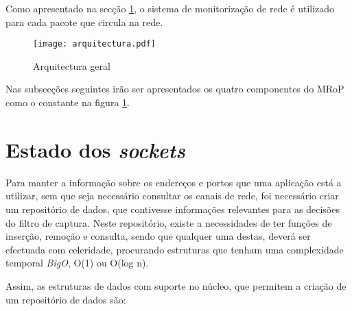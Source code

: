 Como apresentado na secção \ref{}, o sistema de monitorização de rede é utilizado para cada pacote que circula na rede.

\begin{figure}[ht]
\centering
\texttt{[image: arquitectura.pdf]}
\caption{Arquitectura geral}
\label{fig:general_architecture}
\end{figure}







Nas subsecções seguintes irão ser apresentados os quatro componentes do MRoP como o constante na figura \ref{fig:general_architecture}.


\section{Estado dos \textit{sockets}}

Para manter a informação sobre os endereços e portos que uma aplicação está a utilizar, sem que seja necessário consultar os canais de rede, foi necessário criar um repositório de dados, que contivesse informações relevantes para as decisões do filtro de captura.
Neste repositório, existe a necessidades de ter funções de inserção, remoção e consulta, sendo que qualquer uma destas, deverá ser efectuada com celeridade, procurando estruturas que tenham uma complexidade temporal \textit{BigO}, O(1) ou O(log n).

Assim, as estruturas de dados com suporte no núcleo, que permitem a criação de um repositório de dados são:


